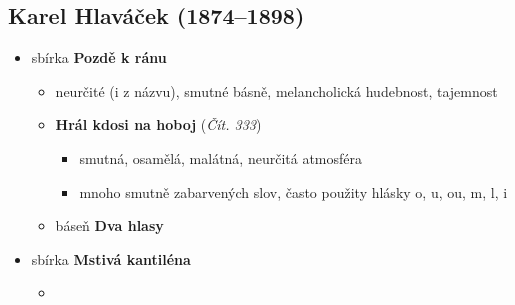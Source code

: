 \subsection{Karel Hlaváček (1874--1898)}
\begin{itemize}

\item sbírka \textbf{Pozdě k ránu}
	\begin{itemize}
	\item neurčité (i z názvu), smutné básně, melancholická hudebnost, tajemnost
	\item \textbf{Hrál kdosi na hoboj} (\textit{Čít. 333})
		\begin{itemize}
		\item smutná, osamělá, malátná, neurčitá atmosféra
		\item mnoho smutně zabarvených slov, často použity hlásky o, u, ou, m, l, i
		\end{itemize}
	\item báseň \textbf{Dva hlasy}
	\end{itemize}
\item sbírka \textbf{Mstivá kantiléna}
	\begin{itemize}
	\item 
	\end{itemize}
\end{itemize}

